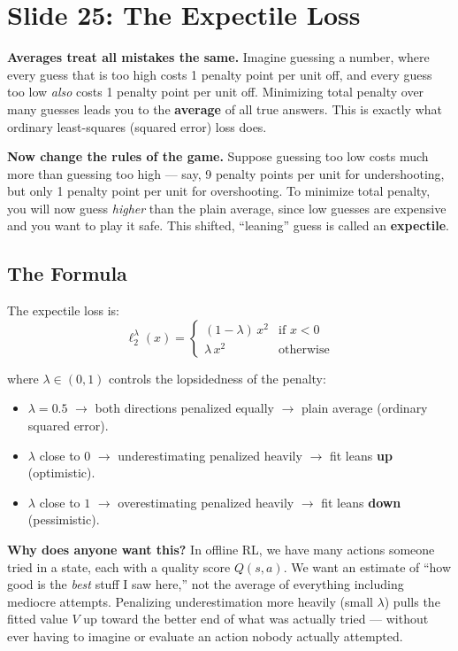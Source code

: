 \documentclass[11pt]{article}
\begin{document}
\section{Slide 25: The Expectile Loss}

\textbf{Averages treat all mistakes the same.} Imagine guessing a number, where every guess that is too high costs 1 penalty point per unit off, and every guess too low \emph{also} costs 1 penalty point per unit off. Minimizing total penalty over many guesses leads you to the \textbf{average} of all true answers. This is exactly what ordinary least-squares (squared error) loss does.

\textbf{Now change the rules of the game.} Suppose guessing too low costs much more than guessing too high — say, 9 penalty points per unit for undershooting, but only 1 penalty point per unit for overshooting. To minimize total penalty, you will now guess \emph{higher} than the plain average, since low guesses are expensive and you want to play it safe. This shifted, ``leaning'' guess is called an \textbf{expectile}.

\subsection{The Formula}

The expectile loss is:
\[
\ell_2^{\lambda}(x) =
\begin{cases}
(1-\lambda)\, x^2 & \text{if } x < 0 \\
\lambda\, x^2 & \text{otherwise}
\end{cases}
\]

where $\lambda \in (0,1)$ controls the lopsidedness of the penalty:

\begin{itemize}
    \item $\lambda = 0.5$ \(\rightarrow\) both directions penalized equally \(\rightarrow\) plain average (ordinary squared error).
    \item $\lambda$ close to $0$ \(\rightarrow\) underestimating penalized heavily \(\rightarrow\) fit leans \textbf{up} (optimistic).
    \item $\lambda$ close to $1$ \(\rightarrow\) overestimating penalized heavily \(\rightarrow\) fit leans \textbf{down} (pessimistic).
\end{itemize}

\textbf{Why does anyone want this?} In offline RL, we have many actions someone tried in a state, each with a quality score $Q(s,a)$. We want an estimate of ``how good is the \emph{best} stuff I saw here,'' not the average of everything including mediocre attempts. Penalizing underestimation more heavily (small $\lambda$) pulls the fitted value $V$ up toward the better end of what was actually tried — without ever having to imagine or evaluate an action nobody actually attempted.
\end{document}
